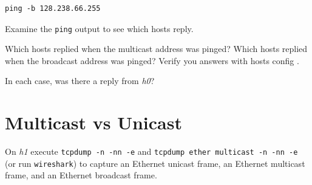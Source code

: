 \documentclass{../UTNetLab}
\begin{document}
    \begin{lstlisting}
ping -b 128.238.66.255
    \end{lstlisting}
    Examine the \lstinline{ping} output to see which hosts reply.

    
    \begin{report}
        \item Which hosts replied when the multicast address was pinged?
            Which hosts replied when the broadcast address was pinged?
            Verify you answers with hosts config .

        \item In each case, was there a reply from \textit{h0}?
    \end{report}

\section{Multicast vs Unicast\label{sec:multicast-vs-unicast}}
    On \textit{h1} execute \lstinline{tcpdump -n -nn -e} and \lstinline{tcpdump ether multicast -n -nn -e} (or run \lstinline{wireshark}) to capture an Ethernet unicast frame, an Ethernet multicast frame, and an Ethernet broadcast frame.
\end{document}
